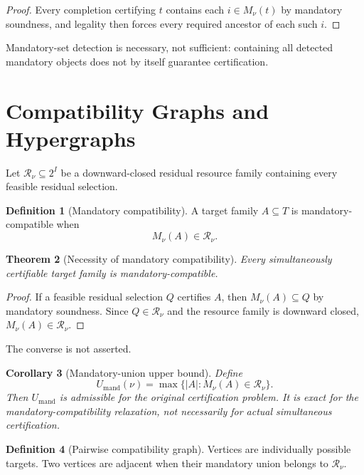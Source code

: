 \documentclass[11pt]{article}
\newtheorem{theorem}{Theorem}[section]
\newtheorem{corollary}[theorem]{Corollary}
\theoremstyle{definition}
\newtheorem{definition}[theorem]{Definition}
\theoremstyle{remark}
\begin{document}
\begin{proof}
Every completion certifying $t$ contains each $i\in M_\nu(t)$ by mandatory soundness, and legality then forces every required ancestor of each such $i$.
\end{proof}

Mandatory-set detection is necessary, not sufficient: containing all detected mandatory objects does not by itself guarantee certification.

\section{Compatibility Graphs and Hypergraphs}

Let $\mathcal R_\nu\subseteq 2^I$ be a downward-closed residual resource family containing every feasible residual selection.

\begin{definition}[Mandatory compatibility]\label{def:mandatory-compatible}
A target family $A\subseteq T$ is mandatory-compatible when
\[
M_\nu(A)\in\mathcal R_\nu.
\]
\end{definition}

\begin{theorem}[Necessity of mandatory compatibility]\label{thm:mandatory-necessary}
Every simultaneously certifiable target family is mandatory-compatible.
\end{theorem}

\begin{proof}
If a feasible residual selection $Q$ certifies $A$, then $M_\nu(A)\subseteq Q$ by mandatory soundness. Since $Q\in\mathcal R_\nu$ and the resource family is downward closed, $M_\nu(A)\in\mathcal R_\nu$.
\end{proof}

The converse is not asserted.

\begin{corollary}[Mandatory-union upper bound]\label{cor:mandatory-upper}
Define
\[
U_{\mathrm{mand}}(\nu)
=
\max\{|A|:M_\nu(A)\in\mathcal R_\nu\}.
\]
Then $U_{\mathrm{mand}}$ is admissible for the original certification problem. It is exact for the mandatory-compatibility relaxation, not necessarily for actual simultaneous certification.
\end{corollary}

\begin{definition}[Pairwise compatibility graph]\label{def:compatibility-graph}
Vertices are individually possible targets. Two vertices are adjacent when their mandatory union belongs to $\mathcal R_\nu$.
\end{definition}
\end{document}
